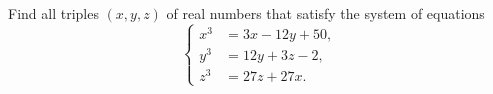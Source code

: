 Find all triples $\left(x,y,z\right)$ of real numbers that satisfy the system of equations \[\begin{cases}
	x^3&=3x-12y+50,\\
	y^3&=12y+3z-2,\\
	z^3&=27z+27x.
\end{cases}\]